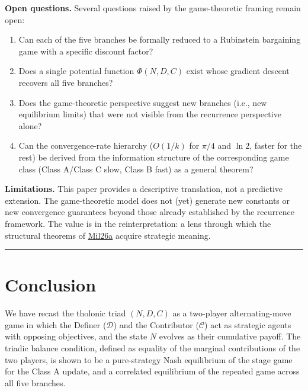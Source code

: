 \documentclass[12pt]{article}
\providecommand{\tightlist}{%
  \setlength{\itemsep}{0pt}\setlength{\parskip}{0pt}}
\begin{document}
\textbf{Open questions.} Several questions raised by the game-theoretic
framing remain open:

\begin{enumerate}
\def\labelenumi{\arabic{enumi}.}
\tightlist
\item
  Can each of the five branches be formally reduced to a Rubinstein
  bargaining game with a specific discount factor?
\item
  Does a single potential function \(\Phi(N, D, C)\) exist whose
  gradient descent recovers all five branches?
\item
  Does the game-theoretic perspective suggest new branches (i.e., new
  equilibrium limits) that were not visible from the recurrence
  perspective alone?
\item
  Can the convergence-rate hierarchy (\(O(1/k)\) for \(\pi/4\) and
  \(\ln 2\), faster for the rest) be derived from the information
  structure of the corresponding game class (Class A/Class C slow, Class
  B fast) as a general theorem?
\end{enumerate}

\textbf{Limitations.} This paper provides a descriptive translation, not
a predictive extension. The game-theoretic model does not (yet) generate
new constants or new convergence guarantees beyond those already
established by the recurrence framework. The value is in the
reinterpretation: a lens through which the structural theorems of
\href{https://github.com/baardev/truevalue/blob/main/docnav/Research/papers/1_recursive-tholonic-five-constants/1_recursive-tholonic-five-constants.pdf}{Mil26a}
acquire strategic meaning.

\begin{center}\rule{0.5\linewidth}{0.5pt}\end{center}

\section{Conclusion}\label{conclusion}

We have recast the tholonic triad \((N, D, C)\) as a two-player
alternating-move game in which the Definer (\(\mathcal{D}\)) and the
Contributor (\(\mathcal{C}\)) act as strategic agents with opposing
objectives, and the state \(N\) evolves as their cumulative payoff. The
triadic balance condition, defined as equality of the marginal
contributions of the two players, is shown to be a pure-strategy Nash
equilibrium of the stage game for the Class A update, and a correlated
equilibrium of the repeated game across all five branches.
\end{document}
